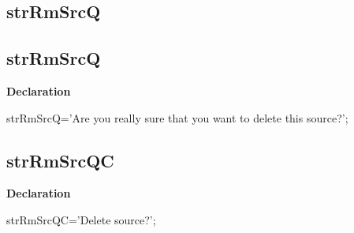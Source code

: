 \documentclass{report}
\newif\ifpdf
\begin{document}
\subsection*{\large{\textbf{strRmSrcQ}}\normalsize\hspace{1ex}\hrulefill}
\else
\subsection*{strRmSrcQ}
\fi
\label{trstrings-strRmSrcQ}
\begin{list}{}{
\setlength{\itemindent}{0cm}
\setlength{\listparindent}{0cm}
\setlength{\leftmargin}{\evensidemargin}
\addtolength{\leftmargin}{\tmplength}
\settowidth{\labelsep}{X}
\addtolength{\leftmargin}{\labelsep}
\setlength{\labelwidth}{\tmplength}
}
\item[\textbf{Declaration}\hfill]
\ifpdf
\begin{flushleft}
\fi
\begin{ttfamily}
strRmSrcQ='Are you really sure that you want to delete this source?';\end{ttfamily}

\ifpdf
\end{flushleft}
\fi

\end{list}
\ifpdf
\subsection*{\large{\textbf{strRmSrcQC}}\normalsize\hspace{1ex}\hrulefill}
\else
\subsection*{strRmSrcQC}
\fi
\label{trstrings-strRmSrcQC}
\begin{list}{}{
\setlength{\itemindent}{0cm}
\setlength{\listparindent}{0cm}
\setlength{\leftmargin}{\evensidemargin}
\addtolength{\leftmargin}{\tmplength}
\settowidth{\labelsep}{X}
\addtolength{\leftmargin}{\labelsep}
\setlength{\labelwidth}{\tmplength}
}
\item[\textbf{Declaration}\hfill]
\ifpdf
\begin{flushleft}
\fi
\begin{ttfamily}
strRmSrcQC='Delete source?';\end{ttfamily}

\ifpdf
\end{flushleft}
\fi

\end{list}
\ifpdf
\end{document}
